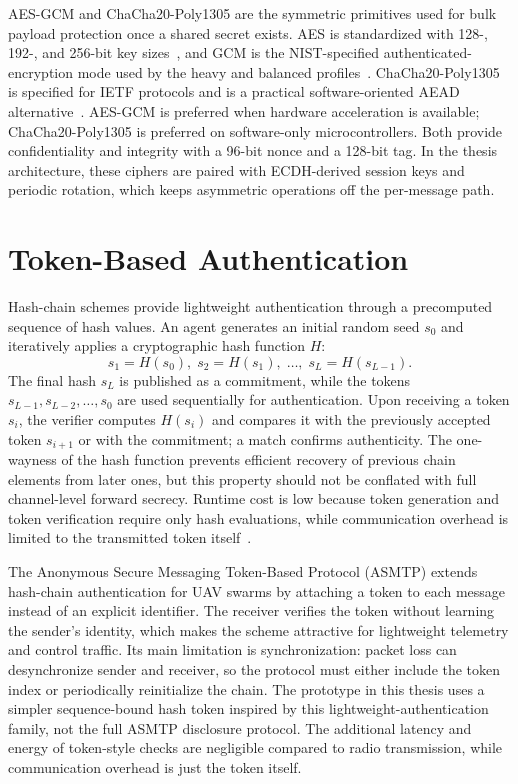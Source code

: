 AES-GCM and ChaCha20-Poly1305 are the symmetric primitives used for bulk payload protection once a shared secret exists. AES is standardized with 128-, 192-, and 256-bit key sizes~\cite{nistFips197AES}, and GCM is the NIST-specified authenticated-encryption mode used by the heavy and balanced profiles~\cite{nistSP80038DGCM}. ChaCha20-Poly1305 is specified for IETF protocols and is a practical software-oriented AEAD alternative~\cite{rfc8439}. AES-GCM is preferred when hardware acceleration is available; ChaCha20-Poly1305 is preferred on software-only microcontrollers. Both provide confidentiality and integrity with a 96-bit nonce and a 128-bit tag. In the thesis architecture, these ciphers are paired with ECDH-derived session keys and periodic rotation, which keeps asymmetric operations off the per-message path.


\section{Token-Based Authentication}
\label{sec:token_auth}

Hash-chain schemes provide lightweight authentication through a precomputed sequence of hash values. An agent generates an initial random seed $s_0$ and iteratively applies a cryptographic hash function $H$:
\begin{equation}
s_1 = H(s_0),\; s_2 = H(s_1),\; \ldots,\; s_L = H(s_{L-1}).
\label{eq:hash_chain}
\end{equation}
The final hash $s_L$ is published as a commitment, while the tokens $s_{L-1}, s_{L-2}, \ldots, s_0$ are used sequentially for authentication. Upon receiving a token $s_i$, the verifier computes $H(s_i)$ and compares it with the previously accepted token $s_{i+1}$ or with the commitment; a match confirms authenticity. The one-wayness of the hash function prevents efficient recovery of previous chain elements from later ones, but this property should not be conflated with full channel-level forward secrecy. Runtime cost is low because token generation and token verification require only hash evaluations, while communication overhead is limited to the transmitted token itself~\cite{manikandanASMTPAnonymousSecureMessaging2024}.

The Anonymous Secure Messaging Token-Based Protocol (ASMTP) extends hash-chain authentication for UAV swarms by attaching a token to each message instead of an explicit identifier. The receiver verifies the token without learning the sender’s identity, which makes the scheme attractive for lightweight telemetry and control traffic. Its main limitation is synchronization: packet loss can desynchronize sender and receiver, so the protocol must either include the token index or periodically reinitialize the chain. The prototype in this thesis uses a simpler sequence-bound hash token inspired by this lightweight-authentication family, not the full ASMTP disclosure protocol. The additional latency and energy of token-style checks are negligible compared to radio transmission, while communication overhead is just the token itself.

